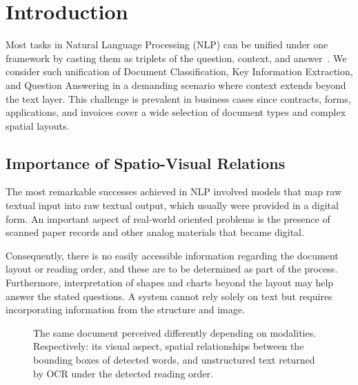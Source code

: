 \documentclass[runningheads]{llncs}
\begin{document}
\section{Introduction}

Most tasks in Natural Language Processing (NLP) can be unified under one framework by casting them as triplets of the question, context, and answer~\cite{pmlr-v48-kumar16,DBLP:journals/corr/abs-1806-08730,khashabi2020unifiedqa}. We consider such unification of Document Classification, Key Information Extraction, and Question Answering in a demanding scenario where context extends beyond the text layer. This challenge is prevalent in business cases since contracts, forms, applications, and invoices cover a wide selection of document types and complex spatial layouts.




\subsection{Importance of Spatio-Visual Relations}  
The most remarkable successes achieved in NLP involved models that map raw textual input into raw textual output, which usually were provided in a digital form.
An important aspect of real-world oriented problems is the presence of scanned paper records and other analog materials that became digital.

Consequently, there is no easily accessible information regarding the document layout or reading order, and these are to be determined as part of the process. Furthermore, interpretation of shapes and charts beyond the layout may help answer the stated questions. A system cannot rely solely on text but requires incorporating information from the structure and image.

\begin{figure}[htp]
\centering
{}\caption{The same document perceived differently depending on modalities. Respectively: its visual aspect, spatial relationships between the bounding boxes of detected words, and unstructured text returned by OCR under the detected reading order.
}
\label{fig:modalities}
\end{figure}
\end{document}
